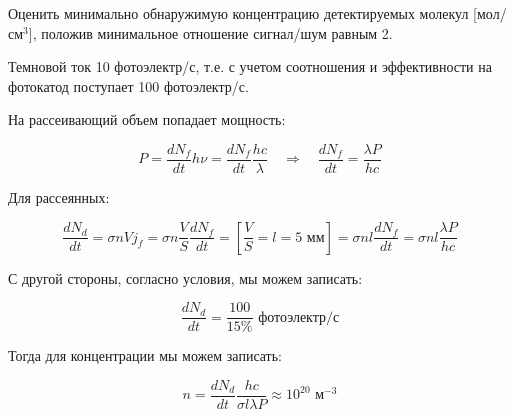 \documentclass[a4paper, 12pt]{article}
\newcommand{\qrq}
{\ensuremath{\quad \Rightarrow \quad}} %
\begin{document}
Оценить минимально обнаружимую концентрацию детектируемых молекул [мол/см$^3$], положив минимальное отношение сигнал/шум равным 2.

Темновой ток 10 фотоэлектр/с, т.е. с учетом соотношения и эффективности на фотокатод поступает 100 фотоэлектр/с.

На рассеивающий объем попадает мощность:

\begin{equation}
	P = \frac{dN_f}{dt} h\nu = \frac{dN_f}{dt} \frac{hc}{\lambda} \qrq \frac{dN_f}{dt} = \frac{\lambda P}{h c}
\end{equation}

Для рассеянных:

\begin{equation}
	\frac{dN_d}{dt} = \sigma n V j_f = \sigma n \frac{V}{S} \frac{dN_f}{dt} = \left[\frac{V}{S} = l = 5 \text{ мм}\right] = \sigma n l \frac{dN_f}{dt} = \sigma n l \frac{\lambda P}{h c}
\end{equation}

С другой стороны, согласно условия, мы можем записать:

\begin{equation}
	\frac{dN_d}{dt} = \frac{100}{15\%} \text{ фотоэлектр/с}
\end{equation}

Тогда для концентрации мы можем записать:

\begin{equation}
	n = \frac{dN_d}{dt} \frac{hc}{\sigma l \lambda P} \approx 10^{20} \text{ м}^{-3}
\end{equation}
\end{document}
